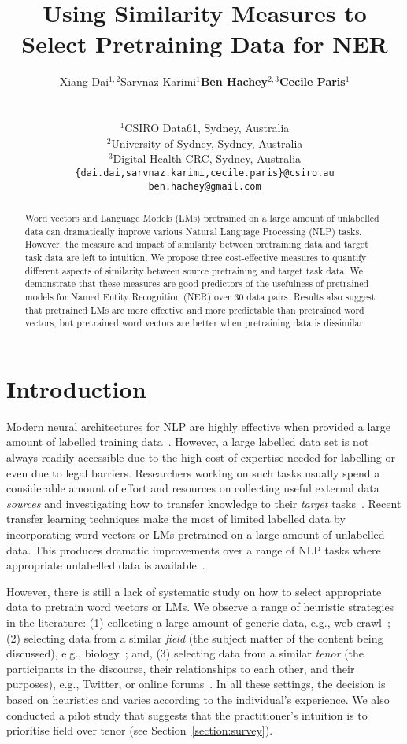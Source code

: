 \documentclass[11pt,a4paper]{article}
\title{Using Similarity Measures to Select Pretraining Data for NER}
\author{\begin{tabular}{cccc}
Xiang Dai$^{1,2}$ & Sarvnaz Karimi$^{1}$ & \textbf{Ben Hachey$^{2,3}$} & \textbf{Cecile Paris$^{1}$}
\end{tabular}\\
\begin{tabular}{cccc}
\multicolumn{4}{c}{$^{1}$CSIRO Data61, Sydney, Australia}\\
\multicolumn{4}{c}{$^{2}$University of Sydney, Sydney, Australia}\\
\multicolumn{4}{c}{$^{3}$Digital Health CRC, Sydney, Australia}\\
\multicolumn{4}{c}{\tt \{dai.dai,sarvnaz.karimi,cecile.paris\}@csiro.au}\\
\multicolumn{4}{c}{\tt ben.hachey@gmail.com} \\
\end{tabular}
}
\date{}
\begin{document}
\maketitle
\begin{abstract}
Word vectors and Language Models (LMs) pretrained on a large amount of unlabelled data can dramatically improve various Natural Language Processing (NLP) tasks. 
However, the measure and impact of similarity between pretraining data and target task data are left to intuition. 
We propose three cost-effective measures to quantify different aspects of similarity between source pretraining and target task data. 
We demonstrate that these measures are good predictors of the usefulness of pretrained models for Named Entity Recognition (NER) over 30 data pairs. 
Results also suggest that pretrained LMs are more effective and more predictable than pretrained word vectors, but pretrained word vectors are better when pretraining data is dissimilar.
\end{abstract}

\section{Introduction\label{sec-intro}}
Modern neural architectures for NLP are highly effective when provided a large amount of labelled training data~\citep{Zhang:Zhao:NIPS:2015,Conneau:Schwenk:EACL:2017,Bowman:Angeli:EMNLP:2015}. 
However, a large labelled data set is not always readily accessible due to the high cost of expertise needed for labelling or even due to legal barriers. 
Researchers working on such tasks usually spend a considerable amount of effort and resources on collecting useful external data {\em sources} and investigating how to transfer knowledge to their {\em target} tasks~\citep{Qi:Collobert:CIKM:2009,Kim:Riloff:AMIA:2017}. 
Recent transfer learning techniques make the most of limited labelled data by incorporating word vectors or LMs pretrained on a large amount of unlabelled data. 
This produces dramatic improvements over a range of NLP tasks where appropriate unlabelled data is available~\citep{Peters:Ammar:ACL:2017,Peters:Neumann:NAACL:2018,Akbik:Blythe:COLING:2018,Devlin:Chang:NAACL:2019}.

However, there is still a lack of systematic study on how to select appropriate data to pretrain word vectors or LMs. 
We observe a range of heuristic strategies in the literature: 
(1) collecting a large amount of generic data, e.g., web crawl~\citep{Pennington:Socher:EMNLP:2014,Mikolov:Grave:LREC:2018}; 
(2) selecting data from a similar \emph{field} (the subject matter of the content being discussed), e.g., biology~\citep{Chiu:Crichton:BioNLP:2016,Karimi:Dai:BioNLP:2017}; and, 
(3) selecting data from a similar \emph{tenor} (the participants in the discourse, their relationships to each other, and their purposes), e.g., Twitter, or online forums~\citep{Li:Shah:arXiv:2017,Chronopoulou:Baziotis:NAACL:2019}. 
In all these settings, the decision is based on heuristics and varies according to the individual's experience. 
We also conducted a pilot study that suggests that the practitioner's intuition is to prioritise field over tenor (see Section~\ref{section:survey}).
\end{document}
